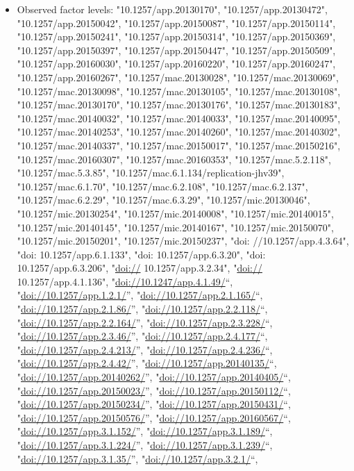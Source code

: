 \documentclass[]{article}
\providecommand{\tightlist}{%
  \setlength{\itemsep}{0pt}\setlength{\parskip}{0pt}}
\begin{document}
\begin{itemize}
\tightlist
\item
  Observed factor levels: "10.1257/app.20130170",
  "10.1257/app.20130472", "10.1257/app.20150042",
  "10.1257/app.20150087", "10.1257/app.20150114",
  "10.1257/app.20150241", "10.1257/app.20150314",
  "10.1257/app.20150369", "10.1257/app.20150397",
  "10.1257/app.20150447", "10.1257/app.20150509",
  "10.1257/app.20160030", "10.1257/app.20160220",
  "10.1257/app.20160247", "10.1257/app.20160267",
  "10.1257/mac.20130028", "10.1257/mac.20130069",
  "10.1257/mac.20130098", "10.1257/mac.20130105",
  "10.1257/mac.20130108", "10.1257/mac.20130170",
  "10.1257/mac.20130176", "10.1257/mac.20130183",
  "10.1257/mac.20140032", "10.1257/mac.20140033",
  "10.1257/mac.20140095", "10.1257/mac.20140253",
  "10.1257/mac.20140260", "10.1257/mac.20140302",
  "10.1257/mac.20140337", "10.1257/mac.20150017",
  "10.1257/mac.20150216", "10.1257/mac.20160307",
  "10.1257/mac.20160353", "10.1257/mac.5.2.118", "10.1257/mac.5.3.85",
  "10.1257/mac.6.1.134/replication-jhv39", "10.1257/mac.6.1.70",
  "10.1257/mac.6.2.108", "10.1257/mac.6.2.137", "10.1257/mac.6.2.29",
  "10.1257/mac.6.3.29", "10.1257/mic.20130046", "10.1257/mic.20130254",
  "10.1257/mic.20140008", "10.1257/mic.20140015",
  "10.1257/mic.20140145", "10.1257/mic.20140167",
  "10.1257/mic.20150070", "10.1257/mic.20150201",
  "10.1257/mic.20150237", "doi: //10.1257/app.4.3.64", "doi:
  10.1257/app.6.1.133", "doi: 10.1257/app.6.3.20", "doi:
  10.1257/app.6.3.206", "\url{doi://} 10.1257/app.3.2.34", "\url{doi://}
  10.1257/app.4.1.136", "\url{doi://10.1247/app.4.1.49/}``,
  "\url{doi://10.1257/app.1.2.1/}'',
  "\url{doi://10.1257/app.2.1.165/}``,
  "\url{doi://10.1257/app.2.1.86/}'',
  "\url{doi://10.1257/app.2.2.118/}``,
  "\url{doi://10.1257/app.2.2.164/}'',
  "\url{doi://10.1257/app.2.3.228/}``,
  "\url{doi://10.1257/app.2.3.46/}'',
  "\url{doi://10.1257/app.2.4.177/}``,
  "\url{doi://10.1257/app.2.4.213/}'',
  "\url{doi://10.1257/app.2.4.236/}``,
  "\url{doi://10.1257/app.2.4.42/}'',
  "\url{doi://10.1257/app.20140135/}``,
  "\url{doi://10.1257/app.20140262/}'',
  "\url{doi://10.1257/app.20140405/}``,
  "\url{doi://10.1257/app.20150023/}'',
  "\url{doi://10.1257/app.20150112/}``,
  "\url{doi://10.1257/app.20150234/}'',
  "\url{doi://10.1257/app.20150431/}``,
  "\url{doi://10.1257/app.20150576/}'',
  "\url{doi://10.1257/app.20160567/}``,
  "\url{doi://10.1257/app.3.1.152/}'',
  "\url{doi://10.1257/app.3.1.189/}``,
  "\url{doi://10.1257/app.3.1.224/}'',
  "\url{doi://10.1257/app.3.1.239/}``,
  "\url{doi://10.1257/app.3.1.35/}'', "\url{doi://10.1257/app.3.2.1/}``,

\end{itemize}
\end{document}
